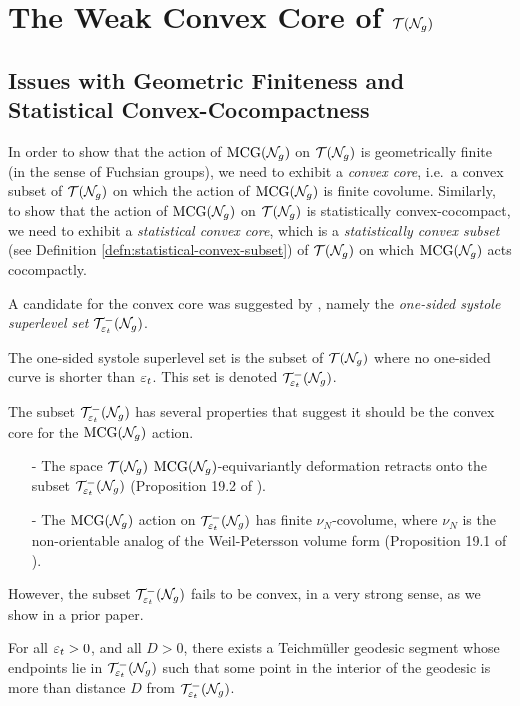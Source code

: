 \section{The Weak Convex Core of $\mathcal{T}(\mathcal{N}_g)$}
\label{sec:weak-convex-core}

\subsection{Issues with Geometric Finiteness and Statistical Convex-Cocompactness}
\label{sec:issu-with-geom}

In order to show that the action of $\mathrm{MCG}(\mathcal{N}_g)$ on $\mathcal{T}(\mathcal{N}_g)$ is geometrically finite (in the sense of Fuchsian groups), we need to exhibit a \emph{convex core}, i.e.\ a convex subset of $\mathcal{T}(\mathcal{N}_g)$ on which the action of $\mathrm{MCG}(\mathcal{N}_g)$ is finite covolume.
Similarly, to show that the action of $\mathrm{MCG}(\mathcal{N}_g)$ on $\mathcal{T}(\mathcal{N}_g)$ is statistically convex-cocompact, we need to exhibit a \emph{statistical convex core}, which is a \emph{statistically convex subset} (see Definition \ref{defn:statistical-convex-subset}) of $\mathcal{T}(\mathcal{N}_g)$ on which $\mathrm{MCG}(\mathcal{N}_g)$ acts cocompactly.

A candidate for the convex core was suggested by \textcite{gendulphe2017whats}, namely the \emph{one-sided systole superlevel set} $\mathcal{T}_{\varepsilon_t}^{-}(\mathcal{N}_g)$.

\begin{definition}
  The one-sided systole superlevel set is the subset of $\mathcal{T}(\mathcal{N}_g)$ where no one-sided curve is shorter than $\varepsilon_t$. This set is denoted $\mathcal{T}_{\varepsilon_t}^{-}(\mathcal{N}_g)$.
\end{definition}

The subset $\mathcal{T}_{\varepsilon_t}^{-}(\mathcal{N}_g)$ has several properties that suggest it should be the convex core for the $\mathrm{MCG}(\mathcal{N}_g)$ action.
\begin{itemize}
\item[-] The space $\mathcal{T}(\mathcal{N}_g)$ $\mathrm{MCG}(\mathcal{N}_g)$-equivariantly deformation retracts onto the subset $\mathcal{T}_{\varepsilon_t}^{-}(\mathcal{N}_g)$ (Proposition 19.2 of \cite{gendulphe2017whats}).
\item[-] The $\mathrm{MCG}(\mathcal{N}_g)$ action on $\mathcal{T}_{\varepsilon_t}^{-}(\mathcal{N}_g)$ has finite $\nu_N$-covolume, where $\nu_N$ is the non-orientable analog of the Weil-Petersson volume form (Proposition 19.1 of \cite{gendulphe2017whats}).
\end{itemize}

However, the subset $\mathcal{T}_{\varepsilon_t}^{-}(\mathcal{N}_g)$ fails to be convex, in a very strong sense, as we show in a prior paper.
\begin{theorem}
  For all $\varepsilon_t > 0$, and all $D > 0$, there exists a Teichmüller geodesic segment whose endpoints lie in $\mathcal{T}_{\varepsilon_t}^{-}(\mathcal{N}_g)$ such that some point in the interior of the geodesic is more than distance $D$ from $\mathcal{T}_{\varepsilon_t}^{-}(\mathcal{N}_g)$.
\end{theorem}

